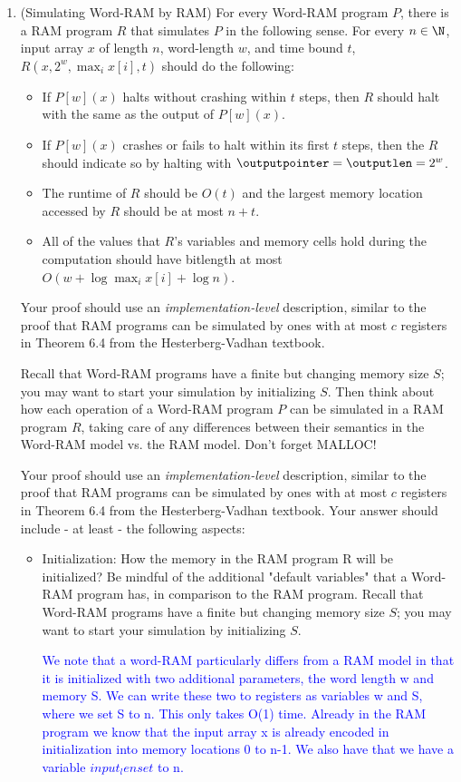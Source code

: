 \documentclass[11pt]{report}
\begin{document}
\begin{enumerate}
\item (Simulating Word-RAM by RAM)
For every Word-RAM program $P$, there is a RAM program $R$ that simulates $P$ in the following sense.  For every $n \in \N$, input array $x$ of length $n$, word-length $w$, and time bound $t$, $R(x,2^w, \max_i x[i],t)$ should do the following:
\begin{itemize}
    \item If $P[w](x)$ halts without crashing within $t$ steps, then $R$ should halt with the same as the output of $P[w](x)$.
    \item If $P[w](x)$ crashes or fails to halt within its first $t$ steps, then the $R$ should indicate so by halting with $\outputpointer=\outputlen=2^w$.
    \item The runtime of $R$ should be $O(t)$ and the largest memory location accessed by $R$ should be at most $n+t$.
    \item All of the values that $R$'s variables and memory cells hold during the computation should have bitlength at most $O(w+\log \max_i x[i] + \log n)$.
\end{itemize}
Your proof should use an {\em implementation-level} description, similar to the proof that RAM programs can be simulated by ones with at most $c$ registers in Theorem 6.4 from the Hesterberg-Vadhan textbook.

Recall that Word-RAM programs have a finite but changing memory size $S$; you may want to start your simulation by initializing $S$.  Then think about how each operation of a Word-RAM program $P$ can be simulated in a RAM program $R$, taking care of any differences between their semantics in the Word-RAM model vs. the RAM model. Don't forget MALLOC!

Your proof should use an {\em implementation-level} description, similar to the proof that RAM programs can be simulated by ones with at most $c$ registers in Theorem 6.4 from the Hesterberg-Vadhan textbook. Your answer should include - at least - the following aspects:
\begin{itemize}
\item Initialization: How the memory in the RAM program R will be initialized? Be mindful of the additional "default variables" that a Word-RAM program has, in comparison to the RAM program. Recall that Word-RAM programs have a finite but changing memory size $S$; you may want to start your simulation by initializing $S$.

\textcolor{blue}{We note that a word-RAM particularly differs from a RAM model in that it is initialized with two additional parameters, the word length w and memory S. We can write these two to registers as variables w and S, where we set S to n. This only takes O(1) time. Already in the RAM program we know that the input array x is already encoded in initialization into memory locations 0 to n-1. We also have that we have a variable $input_len set$ to n.}


\end{itemize}
\end{enumerate}
\end{document}
